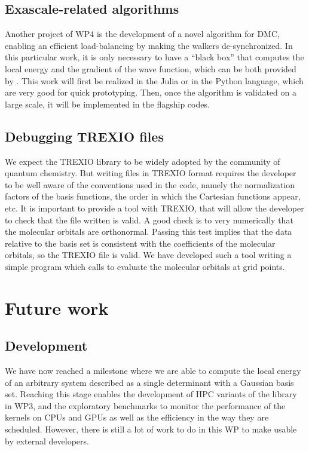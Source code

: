 \subsection{Exascale-related algorithms}

Another project of \ac{WP}4 is the development of a novel algorithm
for \ac{DMC}, enabling an efficient load-balancing by
making the walkers de-synchronized. In this particular work, it is only
necessary to have a ``black box'' that computes the local energy and
the gradient of the wave function, which can be both provided by \QMCkl{}.
This work will first be realized in the Julia or in the Python
language, which are very good for quick prototyping. Then, once the
algorithm is validated on a large scale, it will be implemented in the
flagship codes.


\subsection{Debugging TREXIO files}

We expect the \ac{TREXIO} library to be widely adopted by the community of
quantum chemistry. But writing files in \ac{TREXIO} format requires the developer
to be well aware of the conventions used in the code, namely the normalization factors
of the basis functions, the order in which the Cartesian functions appear, etc.
It is important to provide a tool with \ac{TREXIO}, that will allow the developer to
check that the file written is valid. A good check is to very numerically that the
molecular orbitals are orthonormal. Passing this test implies that the data
relative to the basis set is consistent with the coefficients of the molecular
orbitals, so the \ac{TREXIO} file is valid. We have developed such a tool 
writing a simple program which calls \QMCkl{} to evaluate the molecular orbitals
at grid points.

\section{Future work}

\subsection{Development}

We have now reached a milestone where we are able to compute the local energy of an
arbitrary system described as a single determinant with a Gaussian basis set.
Reaching this stage enables the development of \ac{HPC} variants of the library in
\ac{WP}3, and the exploratory benchmarks to monitor the performance of the kernels on
CPUs and \acp{GPU} as well as the efficiency in the way they are scheduled.
However, there is still a lot of work to do in this \ac{WP} to make \QMCkl{}
usable by external developers.

